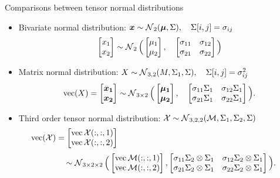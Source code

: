 \documentclass{beamer}
\begin{document}
\begin{frame}{Comparisons between tensor normal distributions}

\begin{itemize}
\item Bivariate normal distribution:  $\bm{x} \sim  \operatorname{\mathcal N}_2(\boldsymbol{\mu},\Sigma),\quad \Sigma[i,j] = \sigma_{ij} $
$$
\begin{bmatrix}
x_1 \\ x_2 
\end{bmatrix}
 \sim \operatorname{\mathcal N}_2 \Big(  
\begin{bmatrix}
\mu_1 \\ \mu_2
\end{bmatrix},\quad
\begin{bmatrix}
  \sigma_{11} & \sigma_{12} \\ \sigma_{21} & \sigma_{22}
\end{bmatrix}
\Big)
$$

\item Matrix normal distribution: $X \sim \operatorname{\mathcal N}_{3,2}(M,\Sigma_1,\Sigma),\quad \Sigma[i,j] = \sigma^2_{ij} $
$$
\operatorname{vec}(X)=
\begin{bmatrix}
 \boldsymbol{x_1} \\ \boldsymbol{x_2} 
\end{bmatrix}  \sim \operatorname{\mathcal N}_{3 \times 2} \Big(  
\begin{bmatrix}
\boldsymbol{\mu_1} \\ \boldsymbol{\mu_2}
\end{bmatrix},\quad
\begin{bmatrix}
 \sigma_{11}\Sigma_1 & \sigma_{12}\Sigma_1 \\ \sigma_{21}\Sigma_1 & \sigma_{22}\Sigma_1
\end{bmatrix}
\Big).
$$

\item Third order tensor normal distribution: $\mathcal X \sim \operatorname{\mathcal N}_{3,2,2} (\mathcal M,\Sigma_1,\Sigma_2,\Sigma)$
$$
\hspace*{0.5cm}\vecc(\mX)=
\begin{bmatrix}
 \vecc{\mX(:,:,1)} \\ \vecc{\mX(:,:,2)}
\end{bmatrix}  \hspace*{8cm} \vspace*{-0.3cm}$$
$$ \hspace*{1cm} \sim \operatorname{\mathcal N}_{3 \times 2 \times 2} \Big(  
\begin{bmatrix}
 \operatorname{vec}{\mathcal M(:,:,1)} \\ \operatorname{vec}{\mathcal M(:,:,2)}
\end{bmatrix},
\begin{bmatrix}
 \sigma_{11}\Sigma_2 \otimes \Sigma_1 & \sigma_{12}\Sigma_2 \otimes \Sigma_1 \\ \sigma_{21}\Sigma_2 \otimes \Sigma_1 & \sigma_{22}\Sigma_2 \otimes \Sigma_1
\end{bmatrix}
\Big).
$$
\end{itemize}




\end{frame}
\end{document}
